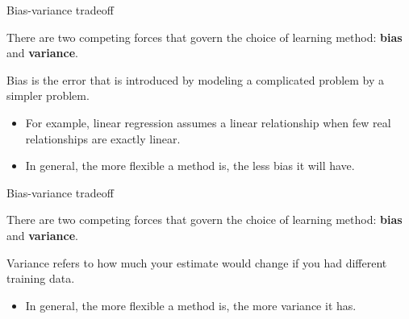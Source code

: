 \documentclass[14pt]{beamer}
\begin{document}
\begin{frame}{Bias-variance tradeoff}
\begin{alertblock}{}
There are two competing forces that govern the
choice of learning method: \textbf{bias} and \textbf{variance}. 
\end{alertblock}

\begin{block}{Bias}
is the error that is introduced by modeling a 
complicated problem by a simpler problem.
\end{block}
\begin{itemize}
\item For example, linear regression assumes a linear relationship when few real relationships are exactly linear.
\item In general, the more flexible a method is, the less bias it will have. 
\end{itemize}
\vspace*{10cm}

\end{frame}

\begin{frame}{Bias-variance tradeoff}
\begin{alertblock}{}
There are two competing forces that govern the
choice of learning method: \textbf{bias} and \textbf{variance}. 
\end{alertblock}

\begin{block}{Variance}
refers to how much your estimate would change if you had different training data.
\end{block}
\begin{itemize}
\item In general, the more flexible a method is, the more variance it has. 
\end{itemize}

\vspace*{10cm}
\end{frame}
\end{document}
